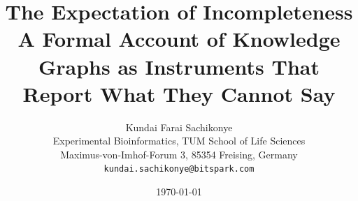 \documentclass[11pt,a4paper]{article}
\theoremstyle{plain}
\theoremstyle{definition}
\theoremstyle{remark}
\begin{document}
\title{%
\textbf{The Expectation of Incompleteness}\\[0.4em]
\large A Formal Account of Knowledge Graphs as Instruments That Report
What They Cannot Say}

\author{%
Kundai Farai Sachikonye\\[0.3em]
\normalsize Experimental Bioinformatics, TUM School of Life Sciences\\
\normalsize Maximus-von-Imhof-Forum 3, 85354 Freising, Germany\\
\normalsize \texttt{kundai.sachikonye@bitspark.com}}

\date{\today}

\maketitle
\end{document}

